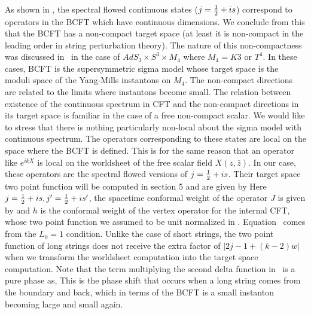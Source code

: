 As shown in \first,
the spectral flowed
continuous states ($j={1\over 2} + is$)
correspond to operators in the BCFT which have
continuous dimensions.
We conclude from this that the BCFT has a non-compact
target space (at least it is non-compact in the leading order
in string perturbation theory).
The nature of this non-compactness was discussed in \sw\ in the
case of $AdS_3 \times S^3 \times M_4$ where $M_4 = K3 $ or $T^4$.
In these cases, BCFT is the supersymmetric sigma model whose
target space is the moduli space of the Yang-Mills instantons
on $M_4$. The non-compact directions are related to the limits
where instantons become small. The relation between
existence of the continuous spectrum in CFT and the
non-compact directions in its target space is familiar
in the case  of a free non-compact scalar. We would like
to stress that there is nothing particularly non-local about
the sigma model with continuous spectrum. The operators corresponding
to these states are local on the space where the BCFT is defined.
This is for the same reason that
an operator like $e^{ikX}$ is local on the worldsheet
of the free scalar field $X(z,\bar{z})$.
In our case, these operators are the spectral flowed versions
of $j={1 \over 2} + is$. Their target space two point function
 will be computed
in section 5 and are given by
\eqn{}
Here $j={1\over 2} + is, j'={1\over 2} + is'$,
the spacetime conformal weight of the operator $J$ is
given by
\eqn{}
and $h$ is the conformal weight of the vertex operator
for the internal CFT,
whose two point function we assumed to be unit normalized in \correcontf .
Equation \jvalue\ comes from the $L_0 =1$ condition.
Unlike the case of short strings,
the two point function of long strings does not receive
the extra factor of $|2j-1+(k-2)w|$ when we transform
the worldsheet computation into the target space computation.
Note that the term multiplying the second delta function in \correcontf\
is a pure phase as,
\eqn{}
 This  is the
phase shift that occurs when a long string comes from the boundary
and back, which in terms of the BCFT is a small instanton becoming large
and small again.


